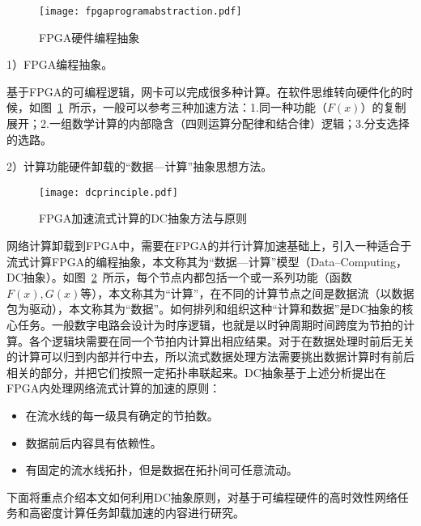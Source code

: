\begin{figure}[!ht]
	\centering 
	\vspace{-1.5mm}
	\texttt{[image: fpgaprogramabstraction.pdf]}
	\caption{FPGA硬件编程抽象} \label{fig:fpgaprogramabstraction}
\end{figure}

1）FPGA编程抽象。
		
基于FPGA的可编程逻辑，网卡可以完成很多种计算。在软件思维转向硬件化的时候，如图~\ref{fig:fpgaprogramabstraction}~所示，一般可以参考三种加速方法：1.同一种功能（$F(x)$）的复制展开；2.一组数学计算的内部隐含（四则运算分配律和结合律）逻辑；3.分支选择的选路。



2）计算功能硬件卸载的“数据---计算”抽象思想方法。

\begin{figure}[!ht]
	\centering 
	\vspace{5.5mm}
	\texttt{[image: dcprinciple.pdf]}
	\caption{FPGA加速流式计算的DC抽象方法与原则} \label{fig:dcprinciple}
\end{figure}

网络计算卸载到FPGA中，需要在FPGA的并行计算加速基础上，引入一种适合于流式计算FPGA的编程抽象，本文称其为“数据---计算”模型（Data--Computing，DC抽象）。如图~\ref{fig:dcprinciple}~所示，每个节点内都包括一个或一系列功能（函数$F(x), G(x)$等），本文称其为“计算”，在不同的计算节点之间是数据流（以数据包为驱动），本文称其为“数据”。如何排列和组织这种“计算和数据”是DC抽象的核心任务。一般数字电路会设计为时序逻辑，也就是以时钟周期时间跨度为节拍的计算。各个逻辑块需要在同一个节拍内计算出相应结果。对于在数据处理时前后无关的计算可以归到内部并行中去，所以流式数据处理方法需要挑出数据计算时有前后相关的部分，并把它们按照一定拓扑串联起来。DC抽象基于上述分析提出在FPGA内处理网络流式计算的加速的原则：

\begin{itemize}
	\item 在流水线的每一级具有确定的节拍数。
	\item 数据前后内容具有依赖性。%
	\item 有固定的流水线拓扑，但是数据在拓扑间可任意流动。
\end{itemize}

下面将重点介绍本文如何利用DC抽象原则，对基于可编程硬件的高时效性网络任务和高密度计算任务卸载加速的内容进行研究。







